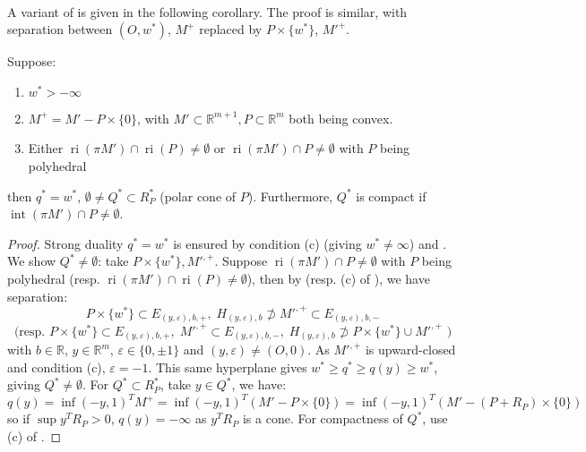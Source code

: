 \paragraph{}A variant of  is given in the following corollary. The proof is similar, with separation between $(O,w^\ast)$, $M^+$ replaced by $P\times \{w^\ast\}$, $M'^{+}$.

\begin{coro}\label{coro:032-variants-reachability}
	Suppose:
	\begin{enumerate}[label=(\alph*)]
		\item $w^\ast>-\infty$
		\item $M^+=M'-P\times \{0\}$, with $M'\subset \mathbb{R}^{m+1},P\subset \mathbb{R}^m$ both being convex.
		\item Either $\operatorname{ri}(\pi M')\cap \operatorname{ri}(P)\neq\emptyset$ or $\operatorname{ri}(\pi M')\cap P\neq\emptyset$ with $P$ being polyhedral
	\end{enumerate}
	then $q^\ast=w^\ast$, $\emptyset\neq Q^\ast\subset R_P^\ast$ (polar cone of $P$). Furthermore, $Q^\ast$ is compact if $\operatorname{int}(\pi M')\cap P\neq\emptyset$.
\end{coro}

\begin{proof}
	Strong duality $q^\ast=w^\ast$ is ensured by condition (c) (giving $w^\ast\neq \infty$) and . We show $Q^\ast\neq\emptyset$: take $P\times \{w^\ast\},M'^{,+}$. Suppose $\operatorname{ri}(\pi M')\cap P\neq\emptyset$ with $P$ being polyhedral (resp. $\operatorname{ri}(\pi M')\cap \operatorname{ri}(P)\neq\emptyset$), then by  (resp. (c) of ), we have separation:
	\[
		P\times \{w^\ast\}\subset E_{(y,\varepsilon ),b,+},\; H_{(y,\varepsilon ),b}\nsupset M'^{,+}\subset E_{(y,\varepsilon ),b,-}
	\]
	\[
		\text{(resp. }P\times \{w^\ast\}\subset E_{(y,\varepsilon ),b,+},\; M'^{,+}\subset E_{(y,\varepsilon ),b,-},\; H_{(y,\varepsilon ),b}\nsupset P\times \{w^\ast\}\cup M'^{,+}\text{ )}
	\]
	with $b\in \mathbb{R}$, $y\in \mathbb{R}^m$, $\varepsilon \in \{0,\pm 1\}$ and $(y,\varepsilon )\neq (O,0)$. As $M'^{,+}$ is upward-closed and condition (c), $\varepsilon =-1$. This same hyperplane gives $w^\ast\geq q^\ast\geq q(y)\geq w^\ast$, giving $Q^\ast\neq\emptyset$. For $Q^\ast\subset R_P^\ast$, take $y\in Q^\ast$, we have:
	\[
		q(y)=\inf (-y, 1)^TM^+ = \inf (-y, 1)^T\left(M'-P\times \{0\}\right) = \inf (-y, 1)^T\left(M'-(P+R_P)\times \{0\}\right)
	\]
	so if $\sup y^TR_P>0$, $q(y)=-\infty$ as $y^TR_P$ is a cone. For compactness of $Q^\ast$, use (c) of .
\end{proof}

